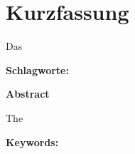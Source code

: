 \hypersetup{pageanchor=false}
\chapter*{Kurzfassung}
\thispagestyle{empty}

Das

\textbf{Schlagworte:} 

\vspace{1cm}
{\bfseries \LARGE Abstract}
\vspace{1cm} 

The

\textbf{Keywords:} 

\cleardoublepage
\hypersetup{pageanchor=true}
